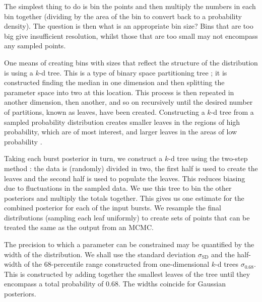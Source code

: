 \documentclass[useAMS,usedcolumn,usegraphicx,usenatbib]{mn2e}
\newcommand{\sub}[1]{\ensuremath{_\mathrm{#1}}}
\begin{document}
The simplest thing to do is bin the points and then multiply the numbers in each bin together (dividing by the area of the bin to convert back to a probability density). The question is then what is an appropriate bin size? Bins that are too big give insufficient resolution, whilst those that are too small may not encompass any sampled points.

One means of creating bins with sizes that reflect the structure of the distribution is using a $k$-d tree. This is a type of binary space partitioning tree \citep[sections 5.2, 12.1, 12.3]{Berg2008}; it is constructed finding the median in one dimension and then splitting the parameter space into two at this location. This process is then repeated in another dimension, then another, and so on recursively until the desired number of partitions, known as leaves, have been created. Constructing a $k$-d tree from a sampled probability distribution creates smaller leaves in the regions of high probability, which are of most interest, and larger leaves in the areas of low probability \citep{Weinberg2012}.

Taking each burst posterior in turn, we construct a $k$-d tree using the two-step method \citep*{Sidery2013,Berry2013a}: the data is (randomly) divided in two, the first half is used to create the leaves and the second half is used to populate the leaves. This reduces biasing due to fluctuations in the sampled data. We use this tree to bin the other posteriors and multiply the totals together. This gives us one estimate for the combined posterior for each of the input bursts. We resample the final distributions (sampling each leaf uniformly) to create sets of points that can be treated the same as the output from an MCMC.

The precision to which a parameter can be constrained may be quantified by the width of the distribution. We shall use the standard deviation $\sigma\sub{SD}$ and the half-width of the $68$-percentile range constructed from one-dimensional $k$-d trees $\sigma_{0.68}$. This is constructed by adding together the smallest leaves of the tree until they encompass a total probability of $0.68$. The widths coincide for Gaussian posteriors.
\end{document}

